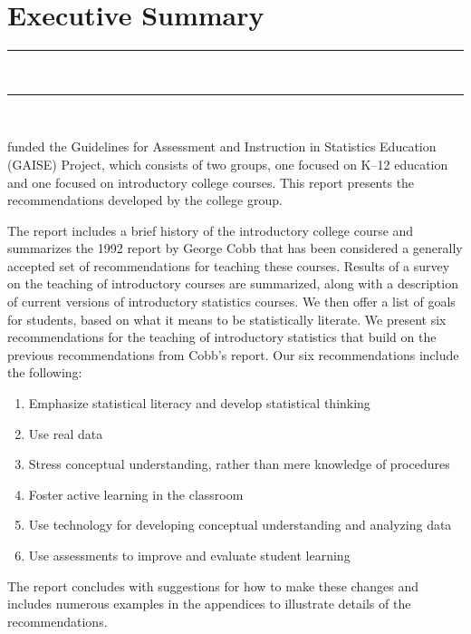 \documentclass[twoside,openany]{tufte-book}
\begin{document}
\clearpage
\chapter{Executive Summary}
\vspace{-.53in}
   \noindent\color{graylight}\rule[0cm]{3.25in}{0.03cm} \\
    \noindent\color{graylight}\rule[0.4cm]{3.25in}{0.03cm} \\
\color{black}
\vspace{.05in}

 funded the Guidelines for Assessment and Instruction in Statistics Education (GAISE) Project, which consists of two groups, one focused on K--12 education and one focused on introductory college courses. This report presents the recommendations developed by the college group. 

The report includes a brief history of the introductory college course and summarizes the 1992 report\cite{cobb1} by George Cobb that has been considered a generally accepted set of recommendations for teaching these courses. Results of a survey on the teaching of introductory courses are summarized, along with a description of current versions of introductory statistics courses. We then offer a list of goals for students, based on what it means to be statistically literate. We present six recommendations for the teaching of introductory statistics that build on the previous recommendations from Cobb's report. Our six recommendations include the following:

\begin{enumerate}[leftmargin=1cm, itemsep=.2em]
\item Emphasize statistical literacy and develop statistical thinking
\item Use real data
\item Stress conceptual understanding, rather than mere knowledge of procedures
\item Foster active learning in the classroom
\item Use technology for developing conceptual understanding and analyzing data
\item Use assessments to improve and evaluate student learning
\end{enumerate}

The report concludes with suggestions for how to make these changes and includes numerous examples in the appendices to illustrate details of the recommendations.
\end{document}
